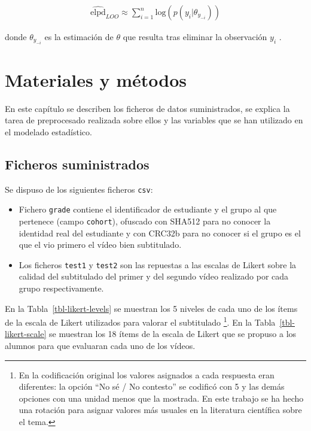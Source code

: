 \documentclass[
  12pt,
  a4paper,
  extrafontsizes,
  onecolumn,
  openright,
  table]{memoir}
\providecommand{\tightlist}{%
  \setlength{\itemsep}{0pt}\setlength{\parskip}{0pt}}\usepackage{longtable,booktabs,array}
\begin{document}
\[
\begin{aligned}
\widehat{\mathrm{elpd}}_{LOO} \approx \sum_{i=1}^{n} \mathrm{log} (p(y_{i} | \theta_{y_{-i}}))
\end{aligned}
\]

donde \(\theta_{y_{-i}}\) es la estimación de \(\theta\) que resulta
tras eliminar la observación \(y_{i}\) \autocite[ver][
pp.~175-176]{gelman2013}.


\hypertarget{sec-metodo}{%
\chapter{Materiales y métodos}\label{sec-metodo}}

En este capítulo se describen los ficheros de datos suministrados, se
explica la tarea de preprocesado realizada sobre ellos y las variables
que se han utilizado en el modelado estadístico.

\hypertarget{ficheros-suministrados}{%
\section{Ficheros suministrados}\label{ficheros-suministrados}}

Se dispuso de los siguientes ficheros \texttt{csv}:

\begin{itemize}
\tightlist
\item
  Fichero \texttt{grade} contiene el identificador de estudiante y el
  grupo al que pertenece (campo \texttt{cohort}), ofuscado con SHA512
  para no conocer la identidad real del estudiante y con CRC32b para no
  conocer si el grupo es el que el vio primero el vídeo bien
  subtitulado.
\item
  Los ficheros \texttt{test1} y \texttt{test2} son las repuestas a las
  escalas de Likert sobre la calidad del subtitulado del primer y del
  segundo vídeo realizado por cada grupo respectivamente.
\end{itemize}

En la Tabla~\ref{tbl-likert-levels} se muestran los 5 niveles de cada
uno de los ítems de la escala de Likert utilizados para valorar el
subtitulado \footnote{En la codificación original los valores asignados
  a cada respuesta eran diferentes: la opción \enquote{No sé / No
  contesto} se codificó con 5 y las demás opciones con una unidad menos
  que la mostrada. En este trabajo se ha hecho una rotación para asignar
  valores más usuales en la literatura científica sobre el tema.}. En la
Tabla~\ref{tbl-likert-scale} se muestran los 18 ítems de la escala de
Likert que se propuso a los alumnos para que evaluaran cada uno de los
vídeos.
\end{document}
